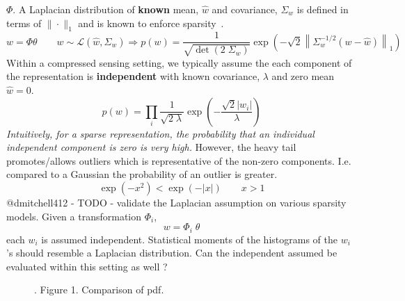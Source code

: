 \documentclass[10pt]{amsart}
\newcommand{\picdir}{./pdffig}
\begin{document}
\begin{enumerate}
\begin{itemize}
$\Phi$.
A Laplacian distribution 
of \textbf{known} mean, $\hat{w}$ and covariance, $\Sigma_w$
is defined in terms of $\|\cdot\|_1$ and is known to enforce
sparsity~\cite{Aravkin2011,Aravkin2011a}.
\[
   w = \Phi \theta
    \qquad
     w \sim \mathcal{L}(\hat{w},\Sigma_w)  
    \Rightarrow
      p(w)  = \frac{1}{ \sqrt{\det\left(2 \; \Sigma_w\right)}} 
                   \exp\left( -\sqrt{2} 
          \left\| 
        \Sigma_w^{-1/2} \left(w - \hat{w}\right)
         \right\|_1
                   \right)
\]
Within a compressed sensing setting, we typically  assume
the each component of the representation is \textbf{independent}
with known covariance, $\lambda$ and zero mean $\hat{w}=0$.
\[
    p(w) = \prod_i  \frac{1}{\sqrt{2 \; \lambda} }
                   \exp\left( 
                  - \frac{\sqrt{2} |w_i|}{\lambda}
                   \right)
\]
\textit{Intuitively, for a sparse representation,
the probability that an individual independent component is zero
is very high.} However, the heavy tail promotes/allows outliers
which is representative of the non-zero components.
I.e. compared to a Gaussian the probability of an outlier is greater.
\[
   \exp(-x^2) < \exp(-|x|)  \qquad x > 1
\]
{\color{red}  @dmitchell412 - TODO - validate the Laplacian assumption
on various sparsity models. Given a transformation $\Phi_i$,
\[
   w = \Phi_i \; \theta
\]
each $w_i$ is assumed independent. Statistical moments
of the histograms of the $w_i$'s should resemble a Laplacian distribution.
Can the independent assumed be evaluated within this setting as well ? 
}
\begin{figure}[h]
\centering
{}
\caption{ \cite{Aravkin2011,Aravkin2011a}. Figure 1.  Comparison of pdf.
} \label{DistributionComparison}
\end{figure}


\end{itemize}
\end{enumerate}
\end{document}
